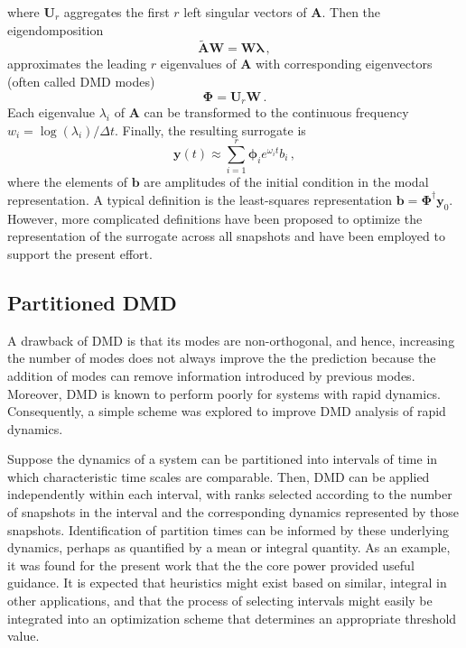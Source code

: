 \documentclass{anstrans}
\renewcommand{\vec}[1]{\bm{#1}} %
\begin{document}
where $\mathbf{U}_r$ aggregates the first $r$  left singular vectors of $\mathbf{A}$.  Then the eigendomposition
\begin{equation}
 \mathbf{\tilde{A}}\mathbf{W} = \mathbf{W}\bm{\lambda} \, ,
\end{equation}
approximates the leading $r$ eigenvalues of $\mathbf{A}$ with corresponding 
eigenvectors (often called DMD modes)
\begin{equation}
 \bm{\Phi} = \mathbf{U}_r \mathbf{W} \, .
\end{equation}
Each eigenvalue $\lambda_i$ of $\mathbf{A}$ can be transformed to the continuous frequency $w_i=\log(\lambda_i)/\Delta t$.
Finally, the resulting surrogate is
\begin{equation}
 \mathbf{y}(t) \approx \sum^r_{i=1} \bm{\phi}_i e^{\omega_i t} b_i \, ,
\end{equation}
where the elements of $\mathbf{b}$ are amplitudes of the initial condition in the modal representation.  A typical definition is 
the least-squares representation $\mathbf{b}=\bm{\Phi}^{\dagger} \mathbf{y}_0$.  However, more complicated definitions have been proposed to optimize the representation of the surrogate across all snapshots \cite{jovanovic2014sparsity} and have been employed to support the present effort.



\subsection{Partitioned DMD}


A drawback of DMD is that its modes are non-orthogonal, and hence, increasing the number of modes does not always improve the the prediction because the addition of modes can remove information introduced by previous modes.
Moreover, DMD is known to perform poorly for systems with rapid dynamics.  
Consequently, a simple scheme was explored to improve DMD analysis of rapid dynamics.

Suppose the dynamics of a system can be partitioned into intervals of time in which characteristic time scales are comparable.
Then, DMD can be applied independently within each interval, with ranks selected according to the number of snapshots in the interval and the corresponding dynamics represented by those snapshots.
Identification of partition times can be informed by these underlying dynamics, perhaps as quantified by a mean or integral quantity. 
As an example, it was found for the present work that the the core power provided useful guidance.
It is expected that heuristics might exist based on similar, integral in other applications, and that the process of selecting intervals might easily be integrated into an optimization scheme that determines an appropriate threshold value.
\end{document}
